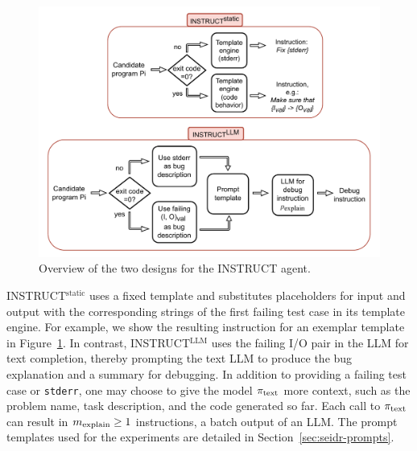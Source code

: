\begin{figure}
    \centering
    \includegraphics[width=0.85\linewidth,trim={0mm 0mm 0mm 0mm}]{images/codex-for-psb-seidr-instruct-2.drawio.pdf}
    \caption{Overview of the two designs for the INSTRUCT agent.}
    \label{fig:method-instruct}
\end{figure}

INSTRUCT$^{\text{static}}$ uses a fixed template and substitutes placeholders for input and output with the corresponding strings of the first failing test case in its template engine.
For example, we show the resulting instruction for an exemplar template in Figure~\ref{fig:method-instruct}.
In contrast, INSTRUCT$^{\text{LLM}}$ uses the failing I/O pair in the LLM for text completion, thereby prompting the text LLM to produce the bug explanation and a summary for debugging. 
In addition to providing a failing test case or \texttt{stderr}, one may choose to give the model $ \pi_\text{text} $ more context, such as the problem name, task description, and the code generated so far. 
Each call to $ \pi_\text{text} $ can result in $m_\text{explain}\ge1$ instructions, a batch output of an LLM.
The prompt templates used for the experiments are detailed in Section~\ref{sec:seidr-prompts}.


